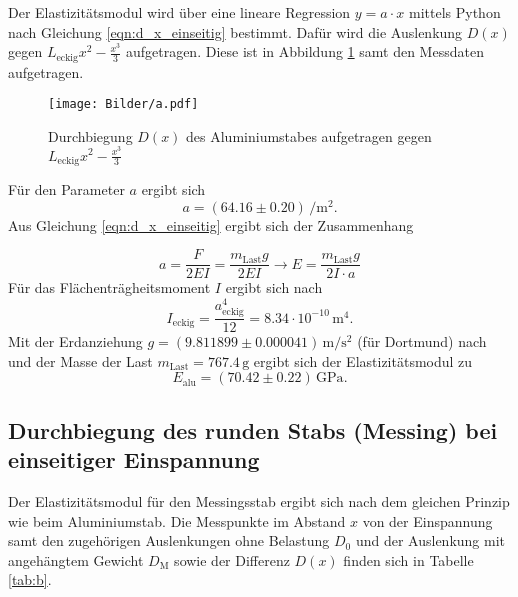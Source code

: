 Der Elastizitätsmodul wird über eine lineare Regression $y= a\cdot x$ mittels Python
nach Gleichung \eqref{eqn:d_x_einseitig} bestimmt.
Dafür wird die Auslenkung $D(x)$ gegen $L_{\mathrm{eckig}}x^2-\frac{x^3}{3}$ aufgetragen.
Diese ist in Abbildung \ref{fig:alu_einseitig} samt den Messdaten aufgetragen.
\begin{figure}
	\centering
	\texttt{[image: Bilder/a.pdf]}
	\caption{Durchbiegung $D(x)$ des Aluminiumstabes aufgetragen gegen $L_{\mathrm{eckig}}x^2-\frac{x^3}{3}$}
	\label{fig:alu_einseitig}
\end{figure}
Für den Parameter $a$ ergibt sich
\begin{equation*}
	a=(64.16\pm 0.20) \,\si{\per\square\meter}  \text{.}
\end{equation*}
Aus Gleichung \eqref{eqn:d_x_einseitig} ergibt sich der Zusammenhang

\begin{equation}
	a= \frac{F}{2EI}=\frac{m_{\mathrm{Last}}g}{2EI} \rightarrow E=\frac{m_{\mathrm{Last}}g}{2I\cdot a}
\end{equation}
Für das Flächenträgheitsmoment $I$ ergibt sich nach \cite{bla}
\begin{equation}
	I_{\mathrm{eckig}}=\frac{a_{\mathrm{eckig}}^4}{12}= 8.34 \cdot 10^{-10} \,\si{\meter\tothe{4}}	 \text{.}
\end{equation}
Mit der Erdanziehung $g=(9.811899 \pm 0.000041) \,\si{\meter\per\square\second}$ (für Dortmund) nach \cite{G} und der Masse der Last $m_{\mathrm{Last}}=767.4\,\si{\gram}$ ergibt sich der Elastizitätsmodul zu
\begin{equation*}
	E_{\mathrm{alu}}= (70.42 \pm 0.22)\,\si{\giga\pascal} \text{.}
\end{equation*}
\FloatBarrier
\subsection{Durchbiegung des runden Stabs (Messing) bei einseitiger Einspannung}
Der Elastizitätsmodul für den Messingsstab ergibt sich nach dem gleichen Prinzip wie beim Aluminiumstab.
Die Messpunkte im Abstand $x$ von der Einspannung samt den zugehörigen Auslenkungen ohne Belastung $D_{\mathrm{0}}$
und der Auslenkung mit angehängtem Gewicht $D_{\mathrm{M}}$ sowie der Differenz $D(x)$ finden sich in Tabelle \ref{tab:b}.

